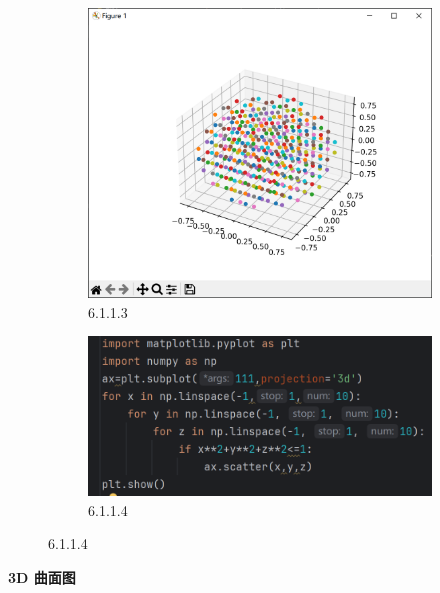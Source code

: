 \documentclass[12pt]{article}
\begin{document}
\begin{figure}[H]
    \centering
    \begin{subfigure}[b]{0.48\textwidth}
        \includegraphics[width=\textwidth]{3D exap Pic2.png} %
        \caption{6.1.1.3}
        \label{fig:line-graph2}
    \end{subfigure}
    \hfill
    \begin{subfigure}[b]{0.48\textwidth}
        \includegraphics[width=\textwidth]{3D exap program2.png} %
        \caption{6.1.1.4}
        \label{fig:line-graph2-pic2}
    \end{subfigure}
\end{figure}
\newpage
\textbf{\Large 3D 曲面图}
\end{document}
